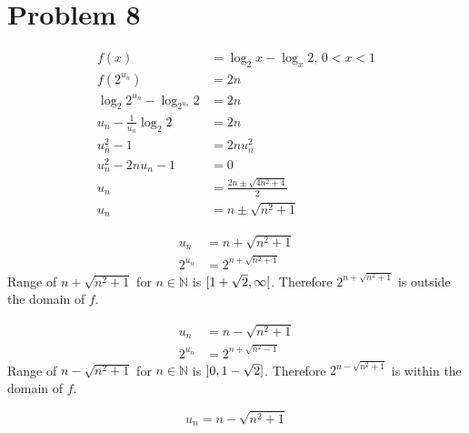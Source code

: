 \documentclass{article}
\begin{document}
\section*{Problem 8}
\begin{align*}
	f(x)&=\log_2{x}-\log_x{2},\,0<x<1 \\
	f(2^{u_n})&=2n \\
	\log_2{2^{u_n}}-\log_{2^{u_n}}{2}&=2n \\
	u_n-\frac{1}{u_n}\log_{2}{2}&=2n \\
	u_n^2-1&=2nu_n^2 \\
	u_n^2-2nu_n-1&=0 \\
	u_n&=\frac{2n\pm\sqrt{4n^2+4}}{2} \\
	u_n&=n\pm\sqrt{n^2+1}
\end{align*}
\centering
\begin{minipage}[t]{.4\textwidth}
	\begin{align*}		
		u_n&=n+\sqrt{n^2+1} \\
		2^{u_n}&=2^{n+\sqrt{n^2+1}}
	\end{align*}
	\flushleft
	Range of $n+\sqrt{n^2+1}$ for $n\in\mathbb{N}$ is $\interval
	[open right]{1+\sqrt{2}}{\infty}$. Therefore $2^{n+\sqrt{n^2+1}}$
	is outside the domain of $f$.
\end{minipage}
\hspace{0.5in}
\begin{minipage}[t]{.4\textwidth}
	\begin{align*}		
		u_n&=n-\sqrt{n^2+1} \\
		2^{u_n}&=2^{n+\sqrt{n^2-1}}
	\end{align*}
	\flushleft
	Range of $n-\sqrt{n^2+1}$ for $n\in\mathbb{N}$ is $\interval
	[open left]{0}{1-\sqrt{2}}$. Therefore $2^{n-\sqrt{n^2+1}}$
	is within the domain of $f$.
\end{minipage}
\begin{equation*}
	\boxed{u_n=n-\sqrt{n^2+1}}
\end{equation*}
\end{document}
